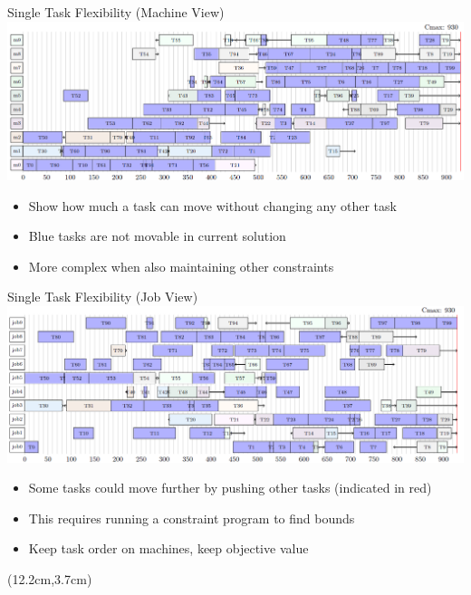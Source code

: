 
\begin{frame}{Single Task Flexibility (Machine View)}
\includegraphics[width=14cm]{images/mt10machinefreedom}
\begin{itemize}
    \item Show how much a task can move without changing any other task
    \item Blue tasks are not movable in current solution
    \item More complex when also maintaining other constraints
\end{itemize}
\end{frame}

\begin{frame}{Single Task Flexibility (Job View)}
\includegraphics[width=14cm]{images/mt10jobfreedom}
\begin{itemize}
    \item Some tasks could move further by pushing other tasks (indicated in red)
    \item This requires running a constraint program to find bounds
    \item Keep task order on machines, keep objective value
\end{itemize}
\begin{textblock*}{2cm}(12.2cm,3.7cm)
\end{textblock*}
\end{frame}

